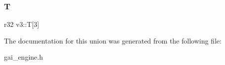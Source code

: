\mbox{\label{unionv3_ad051a9bd43b49b2e6c83d885a746d799}} 
\subsubsection{\texorpdfstring{T}{T}}
{\footnotesize\ttfamily r32 v3\+::T\mbox{[}3\mbox{]}}



The documentation for this union was generated from the following file\+:\begin{DoxyCompactItemize}
\item 
gai\+\_\+engine.\+h\end{DoxyCompactItemize}
